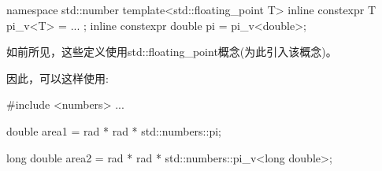 \begin{cpp}
namespace std::number {
	template<std::floating_point T> inline constexpr T pi_v<T> = ... ;
	inline constexpr double pi = pi_v<double>;
}
\end{cpp}

如前所见，这些定义使用std::floating\_point概念(为此引入该概念)。

因此，可以这样使用:

\begin{cpp}
#include <numbers>
...

double area1 = rad * rad * std::numbers::pi;

long double area2 = rad * rad * std::numbers::pi_v<long double>;
\end{cpp}






















